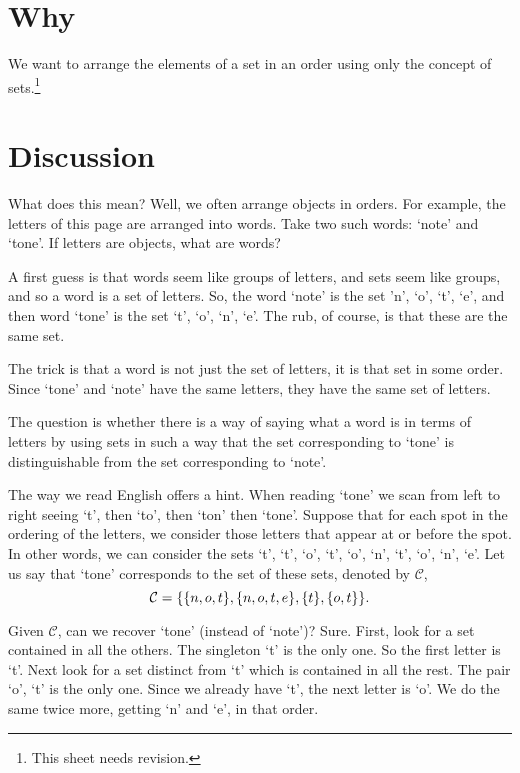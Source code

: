 
\section*{Why}

We want to arrange the elements of a set in an order using only the concept of sets.\footnote{This sheet needs revision.}

\section*{Discussion}

What does this mean? Well, we often arrange objects in orders.
For example, the letters of this page are arranged into words.
Take two such words: `note' and `tone'.
If letters are objects, what are words?

A first guess is that words seem like groups of letters, and sets seem like groups, and so a word is a set of letters.
So, the word `note' is the set {'n', `o', `t', `e'}, and then word `tone' is the set {`t', `o', `n', `e'}.
The rub, of course, is that these are the same set.

The trick is that a word is not just the set of letters, it is that set in some order.
Since `tone' and `note' have the same letters, they have the same set of letters.

The question is whether there is a way of saying what a word is in terms of letters by using sets in such a way that the set corresponding to `tone' is distinguishable from the set corresponding to `note'.


The way we read English offers a hint.
When reading `tone' we scan from left to right seeing `t', then `to', then `ton' then `tone'.
Suppose that for each spot in the ordering of the letters, we consider those letters that appear at or before the spot.
In other words, we can consider the sets {`t'}, {`t', `o'}, {`t', `o', `n'}, {`t', `o', `n', `e'}.
Let us say that `tone' corresponds to the set of these sets, denoted by $\mathcal{C} $,
\[
\mathcal{C}  = \{\{n, o, t\}, \{n, o, t, e\}, \{t\}, \{o, t\}\}.
\]

Given $\mathcal{C} $, can we recover `tone' (instead of `note')?
Sure.
First, look for a set contained in all the others.
The singleton {`t'} is the only one.
So the first letter is `t'.
Next look for a set distinct from `t' which is contained in all the rest.
The pair {`o', `t'} is the only one.
Since we already have `t', the next letter is `o'.
We do the same twice more, getting `n' and `e', in that order.

